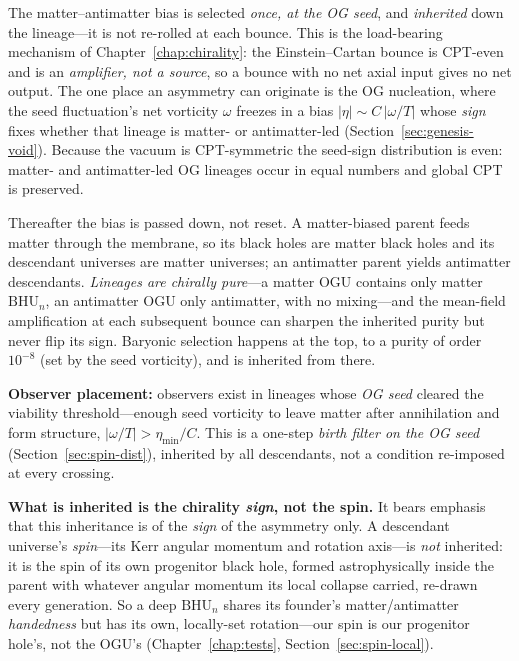 The matter--antimatter bias is selected \emph{once, at the OG seed}, and
\emph{inherited} down the lineage---it is not re-rolled at each bounce. This is
the load-bearing mechanism of Chapter~\ref{chap:chirality}: the Einstein--Cartan
bounce is CPT-even and is an \emph{amplifier, not a source}, so a bounce with no
net axial input gives no net output. The one place an asymmetry can originate is
the OG nucleation, where the seed fluctuation's net vorticity $\omega$ freezes in
a bias $|\eta|\sim C\,|\omega/T|$ whose \emph{sign} fixes whether that lineage is
matter- or antimatter-led (Section~\ref{sec:genesis-void}). Because the vacuum is
CPT-symmetric the seed-sign distribution is even: matter- and antimatter-led OG
lineages occur in equal numbers and global CPT is preserved.

Thereafter the bias is passed down, not reset. A matter-biased parent feeds
matter through the membrane, so its black holes are matter black holes and its
descendant universes are matter universes; an antimatter parent yields antimatter
descendants. \emph{Lineages are chirally pure}---a matter OGU contains only matter
$\mathrm{BHU}_n$, an antimatter OGU only antimatter, with no mixing---and the
mean-field amplification at each subsequent bounce can sharpen the inherited
purity but never flip its sign. Baryonic selection happens at the top, to a
purity of order $10^{-8}$ (set by the seed vorticity), and is inherited from
there.

\textbf{Observer placement:} observers exist in lineages whose \emph{OG seed}
cleared the viability threshold---enough seed vorticity to leave matter after
annihilation and form structure, $|\omega/T| > \eta_{\min}/C$. This is a one-step
\emph{birth filter on the OG seed} (Section~\ref{sec:spin-dist}), inherited by all
descendants, not a condition re-imposed at every crossing.

\textbf{What is inherited is the chirality \emph{sign}, not the spin.} It bears
emphasis that this inheritance is of the \emph{sign} of the asymmetry only. A
descendant universe's \emph{spin}---its Kerr angular momentum and rotation axis---is
\emph{not} inherited: it is the spin of its own progenitor black hole, formed
astrophysically inside the parent with whatever angular momentum its local collapse
carried, re-drawn every generation. So a deep $\mathrm{BHU}_n$ shares its founder's
matter/antimatter \emph{handedness} but has its own, locally-set rotation---our spin
is our progenitor hole's, not the OGU's
(Chapter~\ref{chap:tests}, Section~\ref{sec:spin-local}).

